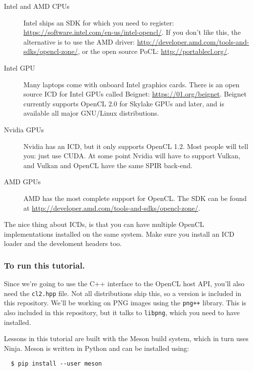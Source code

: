 \documentclass{article}
\begin{document}
    \begin{description}
      \item[Intel and \acs{AMD} \acsp{CPU}] Intel ships an \acs{SDK} for which you need to register: \url{https://software.intel.com/en-us/intel-opencl/}. If you don't like this, the alternative is to use the \acs{AMD} driver: \url{http://developer.amd.com/tools-and-sdks/opencl-zone/}, or the open source \acf{PoCL}: \url{http://portablecl.org/}.
      \item[Intel \acs{GPU}] Many laptops come with onboard Intel graphics cards. There is an open source \acs{ICD} for Intel \acp{GPU} called Beignet: \url{https://01.org/beignet}. Beignet currently supports OpenCL 2.0 for Skylake \acp{GPU} and later, and is available all major \acs{GNU}/Linux distributions.
      \item[Nvidia \acsp{GPU}] Nvidia has an \acs{ICD}, but it only supports OpenCL 1.2. Most people will tell you: just use \ac{CUDA}. At some point Nvidia will have to support Vulkan, and Vulkan and \ac{OpenCL} have the same \ac{SPIR} back-end.
      \item[\acs{AMD} \acsp{GPU}] \acs{AMD} has the most complete support for \ac{OpenCL}. The \ac{SDK} can be found at \url{http://developer.amd.com/tools-and-sdks/opencl-zone/}.
    \end{description}

  The nice thing about \acsp{ICD}, is that you can have multiple \ac{OpenCL} implementations installed on the same system. Make sure you install an \ac{ICD} loader and the develoment headers too.

  \subsubsection{To run this tutorial.}
  Since we're going to use the C++ interface to the \ac{OpenCL} host \acs{API}, you'll also need the {\tt cl2.hpp} file. Not all distributions ship this, so a version is included in this repository. We'll be working on \ac{PNG} images using the {\tt png++} library. This is also included in this repository, but it talks to {\tt libpng}, which you need to have installed.

  Lessons in this tutorial are built with the Meson build system, which in turn uses Ninja. Meson is written in Python and can be installed using:

  \begin{verbatim}
  $ pip install --user meson
  \end{verbatim}
\end{document}
